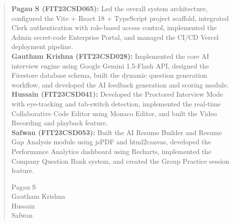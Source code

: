 \documentclass{fisatprojectfinal}
\begin{document}
\newpage
\renewcommand\abstractname{Contribution by Author}
\thispagestyle{plain}
\begin{abstract}
	\vspace{5cm}
	\textbf{Pagau S (FIT23CSD065):} Led the overall system architecture, configured the
	Vite + React 18 + TypeScript project scaffold, integrated Clerk authentication with
	role-based access control, implemented the Admin secret-code Enterprise Portal, and
	managed the CI/CD Vercel deployment pipeline.\\[6pt]
	\textbf{Gautham Krishna (FIT23CSD028):} Implemented the core AI interview engine using
	Google Gemini 1.5-Flash API, designed the Firestore database schema, built the dynamic
	question generation workflow, and developed the AI feedback generation and scoring
	module.\\[6pt]
	\textbf{Hussain (FIT23CSD041):} Developed the Proctored Interview Mode with
	eye-tracking and tab-switch detection, implemented the real-time Collaborative Code
	Editor using Monaco Editor, and built the Video Recording and playback feature.\\[6pt]
	\textbf{Safwan (FIT23CSD053):} Built the AI Resume Builder and Resume Gap Analysis
	module using jsPDF and html2canvas, developed the Performance Analytics dashboard using
	Recharts, implemented the Company Question Bank system, and created the Group Practice
	session feature.\\
	\vspace{1cm}
	\begin{flushright}
		Pagau S\\
		Gautham Krishna\\
		Hussain\\
		Safwan
	\end{flushright}
\end{abstract}
\end{document}

